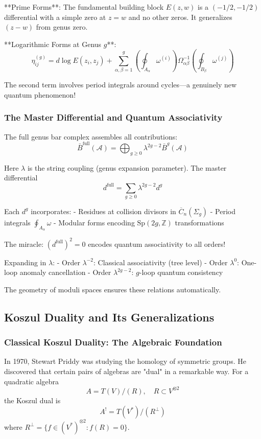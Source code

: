 **Prime Forms**: The fundamental building block $E(z,w)$ is a $(-1/2, -1/2)$ differential with a simple zero at $z = w$ and no other zeros. It generalizes $(z-w)$ from genus zero.

**Logarithmic Forms at Genus $g$**:
$$\eta_{ij}^{(g)} = d\log E(z_i, z_j) + \sum_{\alpha,\beta=1}^g \left(\oint_{A_\alpha} \omega^{(i)}\right) \Omega_{\alpha\beta}^{-1} \left(\oint_{B_\beta} \omega^{(j)}\right)$$

The second term involves period integrals around cycles—a genuinely new quantum phenomenon!

\subsubsection{The Master Differential and Quantum Associativity}

The full genus bar complex assembles all contributions:
$$\bar{B}^{\text{full}}(\mathcal{A}) = \bigoplus_{g \geq 0} \lambda^{2g-2} \bar{B}^g(\mathcal{A})$$

Here $\lambda$ is the string coupling (genus expansion parameter). The master differential
$$d^{\text{full}} = \sum_{g \geq 0} \lambda^{2g-2} d^g$$

Each $d^g$ incorporates:
- Residues at collision divisors in $\overline{C}_n(\Sigma_g)$
- Period integrals $\oint_{A_\alpha} \omega$
- Modular forms encoding $\text{Sp}(2g, \mathbb{Z})$ transformations

The miracle: $(d^{\text{full}})^2 = 0$ encodes quantum associativity to all orders!

Expanding in $\lambda$:
- Order $\lambda^{-2}$: Classical associativity (tree level)
- Order $\lambda^0$: One-loop anomaly cancellation  
- Order $\lambda^{2g-2}$: $g$-loop quantum consistency

The geometry of moduli spaces ensures these relations automatically.

\subsection{Koszul Duality and Its Generalizations}

\subsubsection{Classical Koszul Duality: The Algebraic Foundation}

In 1970, Stewart Priddy was studying the homology of symmetric groups. He discovered that certain pairs of algebras are "dual" in a remarkable way. For a quadratic algebra
$$A = T(V)/(R), \quad R \subset V^{\otimes 2}$$
the Koszul dual is
$$A^! = T(V^*)/(R^\perp)$$
where $R^\perp = \{f \in (V^*)^{\otimes 2} : f(R) = 0\}$.

